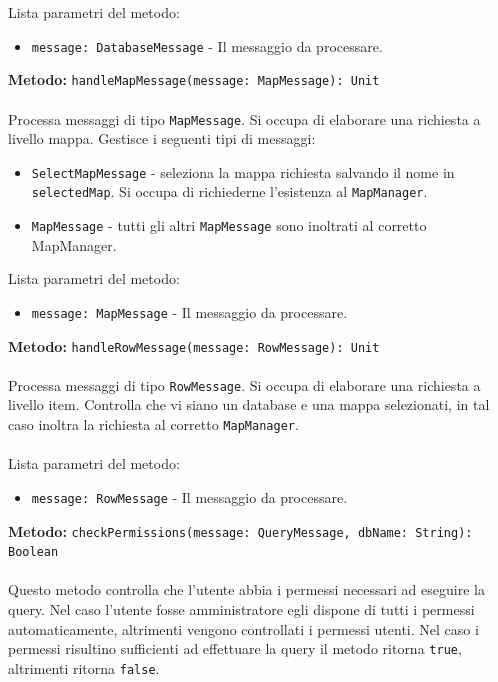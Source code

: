\documentclass[a4paper]{article}
\begin{document}
			Lista parametri del metodo:
			\begin{itemize}
				\item \texttt{message: DatabaseMessage} - Il messaggio da processare.
			\end{itemize}	
		\textbf{Metodo: }\texttt{handleMapMessage(message: MapMessage): Unit}
			\\ \\
			Processa messaggi di tipo \texttt{MapMessage}. Si occupa di elaborare una richiesta a livello mappa.
			Gestisce i seguenti tipi di messaggi:
			\begin{itemize}
				\item \texttt{SelectMapMessage} - seleziona la mappa richiesta salvando il nome in \texttt{selectedMap}. Si occupa di richiederne l'esistenza al \texttt{MapManager}.
				\item \texttt{MapMessage} - tutti gli altri \texttt{MapMessage} sono inoltrati al corretto MapManager.
			\end{itemize}
			Lista parametri del metodo:
			\begin{itemize}
				\item \texttt{message: MapMessage} - Il messaggio da processare.
			\end{itemize}	
		\textbf{Metodo: }\texttt{handleRowMessage(message: RowMessage): Unit}
			\\ \\
			Processa messaggi di tipo \texttt{RowMessage}. Si occupa di elaborare una richiesta a livello item. Controlla che vi siano un database e una mappa selezionati, in tal caso inoltra la richiesta al corretto \texttt{MapManager}.
			\\ \\
			Lista parametri del metodo:
			\begin{itemize}
				\item \texttt{message: RowMessage} - Il messaggio da processare.
			\end{itemize}	
		\textbf{Metodo: }\texttt{checkPermissions(message: QueryMessage, dbName: String): Boolean}
			\\ \\
			Questo metodo controlla che l'utente abbia i permessi necessari ad eseguire la query. Nel caso l'utente fosse amministratore egli dispone di tutti i permessi automaticamente, altrimenti vengono controllati i permessi utenti. Nel caso i permessi risultino sufficienti ad effettuare la query il metodo ritorna \texttt{true}, altrimenti ritorna \texttt{false}.
			\\ \\
\end{document}
